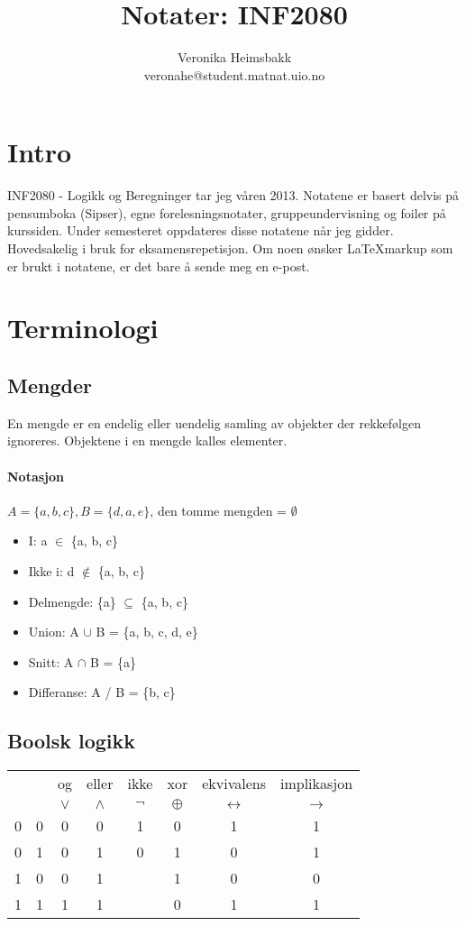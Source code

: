 \documentclass[11pt,a4paper]{article}
\title{Notater: INF2080}
\author{Veronika Heimsbakk \\ 
veronahe@student.matnat.uio.no}
\begin{document}
\maketitle{}
\tableofcontents
\newpage{}

\section{Intro}
INF2080 - Logikk og Beregninger tar jeg våren 2013. Notatene er basert delvis på pensumboka (Sipser), egne forelesningsnotater, gruppeundervisning og foiler på kurssiden. Under semesteret oppdateres disse notatene når jeg gidder. Hovedsakelig i bruk for eksamensrepetisjon. Om noen ønsker \LaTeX markup som er brukt i notatene, er det bare å sende meg en e-post.

\section{Terminologi}
\subsection{Mengder}
En mengde er en endelig eller uendelig samling av objekter der rekkefølgen ignoreres. Objektene i en mengde kalles elementer.

\paragraph{Notasjon} $A = \{a, b, c\}, B = \{d, a, e\}$, den tomme mengden = $\emptyset$
\begin{itemize}
\item{I: a $\in$ \{a, b, c\}}
\item{Ikke i: d $\notin$ \{a, b, c\}}
\item{Delmengde: \{a\} $\subseteq$ \{a, b, c\}}
\item{Union: A $\cup$ B = \{a, b, c, d, e\}}
\item{Snitt: A $\cap$ B = \{a\}}
\item{Differanse: A / B = \{b, c\}}
\end{itemize}

\subsection{Boolsk logikk}
\begin{center}
\begin{tabular}{c c | c c c c c c}
& & og & eller & ikke & xor & ekvivalens & implikasjon\\
& & $\vee$ & $\wedge$ & $\neg$ & $\oplus$ & $\leftrightarrow$ & $\rightarrow$\\
\hline
0 & 0 & 0 & 0 & 1 & 0 & 1 & 1\\
0 & 1 & 0 & 1 & 0 & 1 & 0 & 1\\
1 & 0 & 0 & 1 & & 1 & 0 & 0\\
1 & 1 & 1 & 1 & & 0 & 1 & 1\\
\end{tabular}
\end{center}
\end{document}
